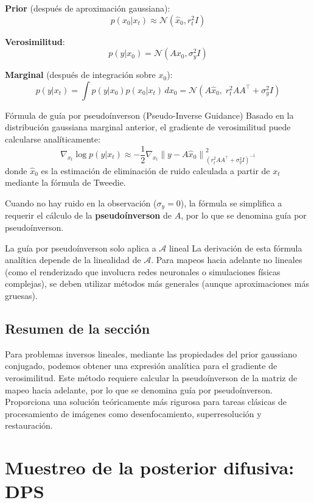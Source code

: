 \documentclass[a4paper]{article}
\begin{document}
\textbf{Prior} (después de aproximación gaussiana):
$$
p(x_0 | x_t) \approx \mathcal{N}(\hat{x}_0, r_t^2 I)
$$

\textbf{Verosimilitud}:
$$
p(y | x_0) = \mathcal{N}(A x_0, \sigma_y^2 I)
$$

\textbf{Marginal} (después de integración sobre $x_0$):
$$
p(y | x_t) = \int p(y | x_0) p(x_0 | x_t) \, dx_0 = \mathcal{N}(A \hat{x}_0, \; r_t^2 A A^\top + \sigma_y^2 I)
$$

\begin{importantbox}{Fórmula de guía por pseudoínverson (Pseudo-Inverse Guidance)}
Basado en la distribución gaussiana marginal anterior, el gradiente de verosimilitud puede calcularse analíticamente:
$$
\nabla_{x_t} \log p(y | x_t) \approx -\frac{1}{2} \nabla_{x_t} \left\| y - A \hat{x}_0 \right\|^2_{(r_t^2 A A^\top + \sigma_y^2 I)^{-1}}
$$
donde $\hat{x}_0$ es la estimación de eliminación de ruido calculada a partir de $x_t$ mediante la fórmula de Tweedie.

Cuando no hay ruido en la observación ($\sigma_y = 0$), la fórmula se simplifica a requerir el cálculo de la \textbf{pseudoínverson} de $A$, por lo que se denomina guía por pseudoínverson.
\end{importantbox}

\begin{warningbox}{La guía por pseudoínverson solo aplica a $\mathcal{A}$ lineal}
La derivación de esta fórmula analítica depende de la linealidad de $\mathcal{A}$. Para mapeos hacia adelante no lineales (como el renderizado que involucra redes neuronales o simulaciones físicas complejas), se deben utilizar métodos más generales (aunque aproximaciones más gruesas).
\end{warningbox}

\subsection{Resumen de la sección}

Para problemas inversos lineales, mediante las propiedades del prior gaussiano conjugado, podemos obtener una expresión analítica para el gradiente de verosimilitud. Este método requiere calcular la pseudoínverson de la matriz de mapeo hacia adelante, por lo que se denomina guía por pseudoínverson. Proporciona una solución teóricamente más rigurosa para tareas clásicas de procesamiento de imágenes como desenfocamiento, superresolución y restauración.
\section{Muestreo de la posterior difusiva: DPS}
\end{document}
